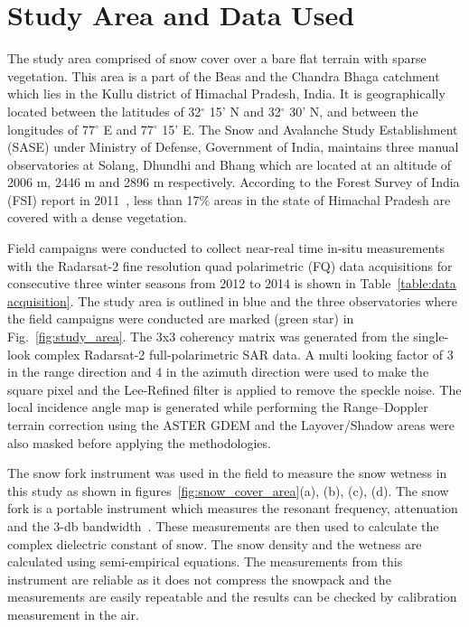 \section{Study Area and Data Used}

The study area comprised of snow cover over a bare flat terrain with sparse vegetation. This area is a part of the Beas and the Chandra Bhaga catchment which lies in the Kullu district of Himachal Pradesh, India. It is geographically located between the latitudes of 32$^\circ$ 15' N and 32$^\circ$ 30' N, and between the longitudes of 77$^\circ$ E and 77$^\circ$ 15' E. The Snow and Avalanche Study Establishment (SASE) under Ministry of Defense, Government of India, maintains three manual observatories at Solang, Dhundhi and Bhang which are located at an altitude of 2006 m, 2446 m and 2896 m respectively. According to the Forest Survey of India (FSI) report in 2011~\citep{FSI2011}, less than 17$\%$ areas in the state of Himachal Pradesh are covered with a dense vegetation. 

Field campaigns were conducted to collect near-real time in-situ measurements with the Radarsat-2 fine resolution quad polarimetric (FQ) data acquisitions for consecutive three winter seasons from 2012 to 2014 is shown in Table~\ref{table:data acquisition}. The study area is outlined in blue and the three observatories where the field campaigns were conducted are marked (green star) in Fig.~\ref{fig:study_area}. The 3x3 coherency matrix was generated from the single-look complex Radarsat-2 full-polarimetric SAR data. A multi looking factor of 3 in the range direction and 4 in the azimuth direction were used to make the square pixel and the Lee-Refined filter is applied to remove the speckle noise. The local incidence angle map is generated while performing the Range–Doppler terrain correction using the ASTER GDEM and the Layover/Shadow areas were also masked before applying the methodologies. 

The snow fork instrument was used in the field to measure the snow wetness in this study as shown in figures~\ref{fig:snow_cover_area}(a), (b), (c), (d). The snow fork is a portable instrument which measures the resonant frequency, attenuation and the 3-db bandwidth~\cite{sihvola1986snow}. These measurements are then used to calculate the complex dielectric constant of snow. The snow density and the wetness are calculated using semi-empirical equations. The measurements from this instrument are reliable as it does not compress the snowpack and the measurements are easily repeatable and the results can be checked by calibration measurement in the air. 

